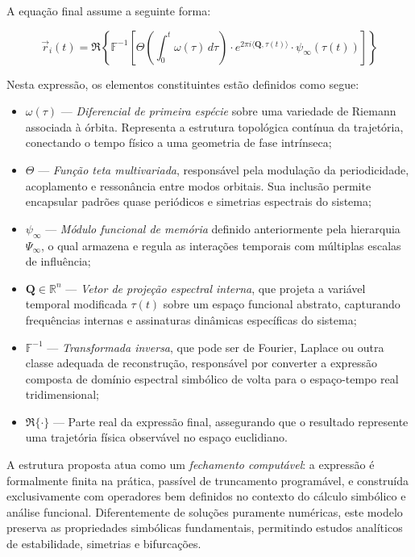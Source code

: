 \documentclass[12pt]{article}
\begin{document}
A equação final assume a seguinte forma:

\[
\vec{r}_i(t) = \Re \left\{ \mathbb{F}^{-1} \left[ \Theta\left( \int_0^t \omega(\tau) \, d\tau \right) \cdot e^{2\pi i \langle \mathbf{Q}, \tau(t) \rangle} \cdot \psi_\infty(\tau(t)) \right] \right\}
\]

Nesta expressão, os elementos constituintes estão definidos como segue:

\begin{itemize}
    \item \( \omega(\tau) \) — \textit{Diferencial de primeira espécie} sobre uma variedade de Riemann associada à órbita. Representa a estrutura topológica contínua da trajetória, conectando o tempo físico a uma geometria de fase intrínseca;

    \item \( \Theta \) — \textit{Função teta multivariada}, responsável pela modulação da periodicidade, acoplamento e ressonância entre modos orbitais. Sua inclusão permite encapsular padrões quase periódicos e simetrias espectrais do sistema;

    \item \( \psi_\infty \) — \textit{Módulo funcional de memória} definido anteriormente pela hierarquia \(\Psi_\infty\), o qual armazena e regula as interações temporais com múltiplas escalas de influência;

    \item \( \mathbf{Q} \in \mathbb{R}^n \) — \textit{Vetor de projeção espectral interna}, que projeta a variável temporal modificada \( \tau(t) \) sobre um espaço funcional abstrato, capturando frequências internas e assinaturas dinâmicas específicas do sistema;

    \item \( \mathbb{F}^{-1} \) — \textit{Transformada inversa}, que pode ser de Fourier, Laplace ou outra classe adequada de reconstrução, responsável por converter a expressão composta de domínio espectral simbólico de volta para o espaço-tempo real tridimensional;

    \item \( \Re \{ \cdot \} \) — Parte real da expressão final, assegurando que o resultado represente uma trajetória física observável no espaço euclidiano.
\end{itemize}

A estrutura proposta atua como um \textit{fechamento computável}: a expressão é formalmente finita na prática, passível de truncamento programável, e construída exclusivamente com operadores bem definidos no contexto do cálculo simbólico e análise funcional. Diferentemente de soluções puramente numéricas, este modelo preserva as propriedades simbólicas fundamentais, permitindo estudos analíticos de estabilidade, simetrias e bifurcações.
\end{document}
